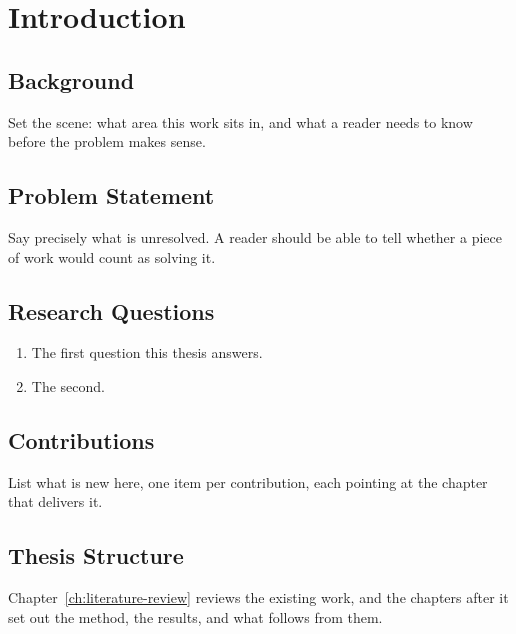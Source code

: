 \chapter{Introduction}
\label{ch:introduction}

\section{Background}

Set the scene: what area this work sits in, and what a reader needs to
know before the problem makes sense.

\section{Problem Statement}

Say precisely what is unresolved. A reader should be able to tell
whether a piece of work would count as solving it.

\section{Research Questions}

\begin{enumerate}
    \item The first question this thesis answers.
    \item The second.
\end{enumerate}

\section{Contributions}

List what is new here, one item per contribution, each pointing at the
chapter that delivers it.

\section{Thesis Structure}

Chapter~\ref{ch:literature-review} reviews the existing work, and the
chapters after it set out the method, the results, and what follows
from them.
